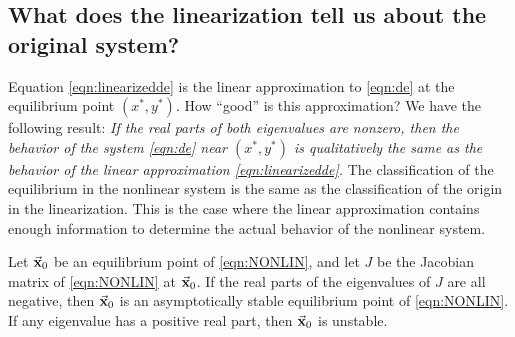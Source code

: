 \subsection*{What does the linearization tell us about the original system?}
Equation \eqref{eqn:linearizedde}
is the linear approximation to \eqref{eqn:de} at the
equilibrium point $(x^*,y^*)$.
How ``good'' is this approximation?
We have the following result:
\emph{If the real parts of both eigenvalues
are nonzero, then the behavior of the system \eqref{eqn:de}
near $(x^*,y^*)$ is qualitatively the same as the behavior of the
linear approximation \eqref{eqn:linearizedde}.}
The classification of the equilibrium in the nonlinear system
is the same as the classification of the origin in
the linearization.
This is the case where the linear approximation contains
enough information to determine the actual behavior of the
nonlinear system.

\begin{theorem}
Let $\vec{\textbf{x}}_0$ be an equilibrium point of
\eqref{eqn:NONLIN}, and let $J$ be the Jacobian
matrix of \eqref{eqn:NONLIN} at $\vec{\textbf{x}}_0$.
If the real parts of the eigenvalues of $J$
are all negative, then $\vec{\textbf{x}}_0$ is an
asymptotically stable equilibrium point
of \eqref{eqn:NONLIN}.
If any eigenvalue has a positive real part,
then $\vec{\textbf{x}}_0$ is unstable.
\end{theorem}

